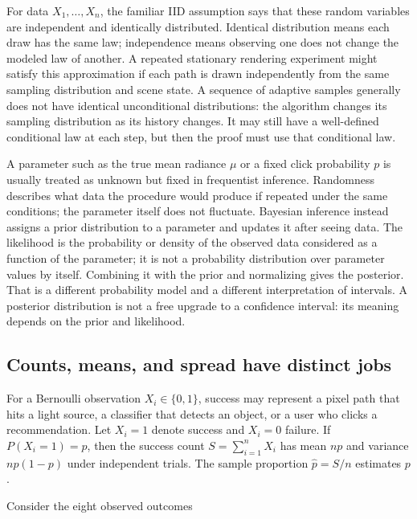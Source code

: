 For data \(X_1,\ldots,X_n\), the familiar IID assumption says that these random variables are independent and identically distributed. Identical distribution means each draw has the same law; independence means observing one does not change the modeled law of another. A repeated stationary rendering experiment might satisfy this approximation if each path is drawn independently from the same sampling distribution and scene state. A sequence of adaptive samples generally does not have identical unconditional distributions: the algorithm changes its sampling distribution as its history changes. It may still have a well-defined conditional law at each step, but then the proof must use that conditional law.

A parameter such as the true mean radiance \(\mu\) or a fixed click probability \(p\) is usually treated as unknown but fixed in frequentist inference. Randomness describes what data the procedure would produce if repeated under the same conditions; the parameter itself does not fluctuate. Bayesian inference instead assigns a prior distribution to a parameter and updates it after seeing data. The likelihood is the probability or density of the observed data considered as a function of the parameter; it is not a probability distribution over parameter values by itself. Combining it with the prior and normalizing gives the posterior. That is a different probability model and a different interpretation of intervals. A posterior distribution is not a free upgrade to a confidence interval: its meaning depends on the prior and likelihood.

\subsection{Counts, means, and spread have distinct jobs}\label{03-visual-computing-i-ch012-counts-means-and-spread-have-distinct-jobs}

\hypertarget{03-visual-computing-i-ch012-counts-means-and-spread-have-distinct-jobs}{}

For a Bernoulli observation \(X_i\in\{0,1\}\), success may represent a pixel path that hits a light source, a classifier that detects an object, or a user who clicks a recommendation. Let \(X_i=1\) denote success and \(X_i=0\) failure. If \(P(X_i=1)=p\), then the success count \(S=\sum_{i=1}^n X_i\) has mean \(np\) and variance \(np(1-p)\) under independent trials. The sample proportion \(\hat p=S/n\) estimates \(p\).

Consider the eight observed outcomes

